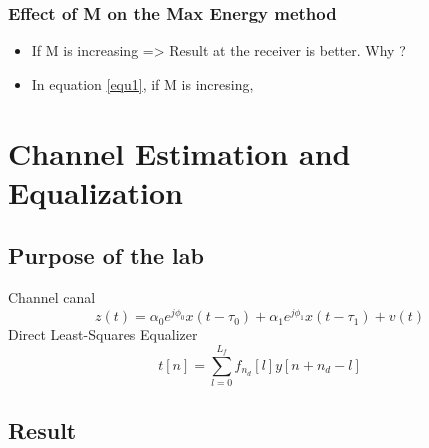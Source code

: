 \documentclass[11pt]{beamer}
\begin{document}
\begin{frame}
\frametitle{Effect of M on the Max Energy method}

\begin{itemize}

\item If M is increasing => Result at the receiver  is better. Why ?

\item In equation \ref{equ1}, if M is incresing, 



\end{itemize}



\end{frame}

\section{Channel Estimation and Equalization}
\subsection{Purpose of the lab}
\begin{frame}
Channel canal
\begin{equation}
z(t) = \alpha_0 e^{j\phi_0}x(t-\tau_0) + \alpha_1 e^{j\phi_1}x(t-\tau_1) + v(t)
\end{equation}
Direct Least-Squares Equalizer
\begin{equation}
t[n] = \sum_{l=0}^{L_f} {f_{n_d}[l]y[n + n_d -l ]}
\end{equation}
\end{frame}
\subsection{Result}
\end{document}
